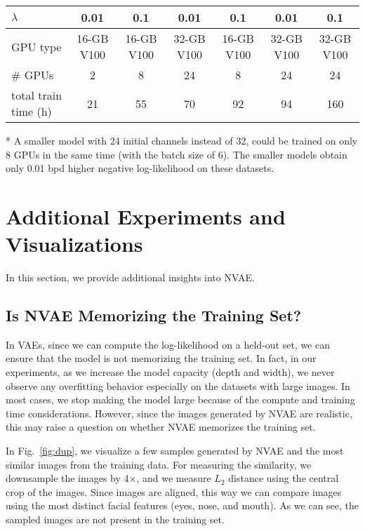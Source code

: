 \documentclass{article}
\begin{document}
\begin{table*}
{\begin{threeparttable}
\begin{tabular}{lcccccc}
        $\lambda$                  & 0.01 & 0.1 & 0.01 & 0.1 & 0.01 & 0.1 \\ \hline
        GPU type    & 16-GB V100 & 16-GB V100 & 32-GB V100 & 16-GB V100 & 32-GB V100 & 32-GB V100\\ \hline
        \# GPUs                & 2 & 8 & 24 & 8 & 24\tnote{*} & 24\tnote{*} \\ \hline
        total train time (h)   & 21 & 55 & 70 & 92 & 94 & 160\\ 
        \bottomrule
        \end{tabular}
        \begin{tablenotes}\footnotesize
        \item[*] A smaller model with 24 initial channels instead of 32, could be trained on only 8 GPUs in the same time (with the batch size of 6). The smaller models obtain only 0.01 bpd higher negative log-likelihood on these datasets.
        \end{tablenotes}
        \end{threeparttable}
}
\end{table*} 

\section{Additional Experiments and Visualizations}
In this section, we provide additional insights into NVAE.

\subsection{Is NVAE Memorizing the Training Set?}
In VAEs, since we can compute the log-likelihood on a held-out set, we can ensure that the model is not memorizing the training set. In fact, in our experiments, as we increase the model capacity (depth and width), we never observe any overfitting behavior especially on the datasets with large images. In most cases, we stop making the model large because of the compute and training time considerations. However, since the images generated by NVAE are realistic, this may raise a question on whether NVAE memorizes the training set.

In Fig.~\ref{fig:dup}, we visualize a few samples generated by NVAE and the most similar images from the training data. For measuring the similarity, we downsample the images by 4$\times$, and we measure $L_2$ distance using the central crop of the images. Since images are aligned, this way we can compare images using the most distinct facial features (eyes, nose, and mouth). As we can see, the sampled images are not present in the training set.
\end{document}
